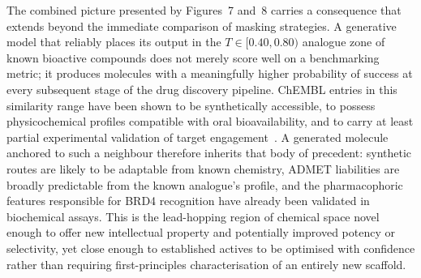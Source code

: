 \documentclass[a4paper,12pt]{article}
\begin{document}
The combined picture presented by Figures~7 and~8 carries a consequence
that extends beyond the immediate comparison of masking strategies.
A generative model that reliably places its output in the
$T \in [0.40, 0.80)$ analogue zone of known bioactive compounds does
not merely score well on a benchmarking metric; it produces molecules
with a meaningfully higher probability of success at every subsequent
stage of the drug discovery pipeline.
ChEMBL entries in this similarity range have been shown to be
synthetically accessible, to possess physicochemical profiles compatible
with oral bioavailability, and to carry at least partial experimental
validation of target engagement~\cite{gaulton2012chembl}.
A generated molecule anchored to such a neighbour therefore inherits
that body of precedent: synthetic routes are likely to be adaptable
from known chemistry, ADMET liabilities are broadly predictable from
the known analogue's profile, and the pharmacophoric features
responsible for BRD4 recognition have already been validated in
biochemical assays.
This is the lead-hopping region of chemical space novel enough to
offer new intellectual property and potentially improved potency or
selectivity, yet close enough to established actives to be optimised
with confidence rather than requiring first-principles characterisation
of an entirely new scaffold.
 
\end{document}
